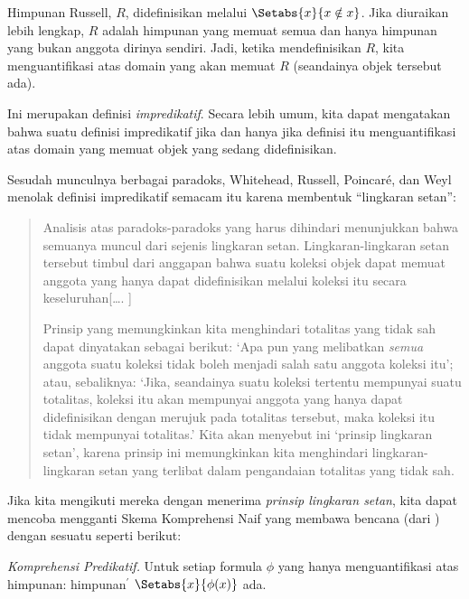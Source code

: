 \documentclass[../../../include/open-logic-section]{subfiles}
\begin{document}


Himpunan Russell, $R$, didefinisikan melalui $\Setabs{x}{x \notin
x}$. Jika diuraikan lebih lengkap, $R$ adalah himpunan yang memuat semua dan
hanya himpunan yang bukan anggota dirinya sendiri. Jadi, ketika mendefinisikan
$R$, kita menguantifikasi atas domain yang akan memuat $R$ (seandainya objek
tersebut ada).

Ini merupakan definisi \emph{impredikatif}. Secara lebih umum, kita dapat
mengatakan bahwa suatu definisi impredikatif jika dan hanya jika definisi itu menguantifikasi
atas domain yang memuat objek yang sedang didefinisikan.
	
Sesudah munculnya berbagai paradoks, Whitehead, Russell, Poincar\'{e}, dan
Weyl menolak definisi impredikatif semacam itu karena membentuk
``lingkaran setan'':
\begin{quote}
	Analisis atas paradoks-paradoks yang harus dihindari menunjukkan bahwa
	semuanya muncul dari sejenis lingkaran setan. Lingkaran-lingkaran setan
	tersebut timbul dari anggapan bahwa suatu koleksi objek dapat
	memuat anggota yang hanya dapat didefinisikan melalui koleksi itu secara
	keseluruhan[\ldots. \textparagraph]

	Prinsip yang memungkinkan kita menghindari totalitas yang tidak sah dapat
	dinyatakan sebagai berikut: `Apa pun yang melibatkan \emph{semua} anggota
	suatu koleksi tidak boleh menjadi salah satu anggota koleksi itu'; atau,
	sebaliknya: `Jika, seandainya suatu koleksi tertentu mempunyai suatu
	totalitas, koleksi itu akan mempunyai anggota yang hanya dapat didefinisikan
	dengan merujuk pada totalitas tersebut, maka koleksi itu tidak mempunyai
	totalitas.' Kita akan menyebut ini `prinsip lingkaran setan', karena
	prinsip ini memungkinkan kita menghindari lingkaran-lingkaran setan yang
	terlibat dalam pengandaian totalitas yang tidak sah.
	\citep[p.~37]{WhiteheadRussell1910}
\end{quote}
Jika kita mengikuti mereka dengan menerima \emph{prinsip lingkaran setan},
kita dapat mencoba mengganti Skema Komprehensi Naif yang membawa bencana
(dari ) dengan sesuatu seperti berikut:

\begin{defish}
\emph{Komprehensi Predikatif.} Untuk setiap formula $\phi$ yang hanya
menguantifikasi atas himpunan: himpunan$^\prime$
$\Setabs{x}{\phi(x)}$ ada.
\end{defish}
\end{document}

